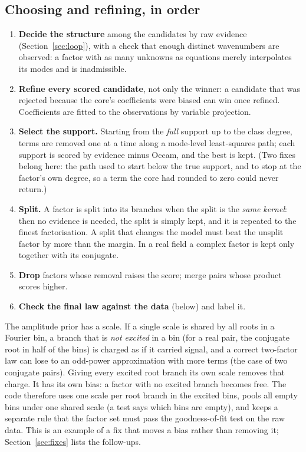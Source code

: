 \subsection{Choosing and refining, in order}
\begin{enumerate}[nosep]
\item \textbf{Decide the structure} among the candidates by raw evidence (Section~\ref{sec:loop}), with a check that enough distinct wavenumbers are observed: a factor with as many unknowns as equations merely interpolates its modes and is inadmissible.
\item \textbf{Refine every scored candidate}, not only the winner: a candidate that was rejected because the core's coefficients were biased can win once refined. Coefficients are fitted to the observations by variable projection.
\item \textbf{Select the support.} Starting from the \emph{full} support up to the class degree, terms are removed one at a time along a mode-level least-squares path; each support is scored by evidence minus Occam, and the best is kept. (Two fixes belong here: the path used to start below the true support, and to stop at the factor's own degree, so a term the core had rounded to zero could never return.)
\item \textbf{Split.} A factor is split into its branches when the split is the \emph{same kernel}: then no evidence is needed, the split is simply kept, and it is repeated to the finest factorisation. A split that changes the model must beat the unsplit factor by more than the margin. In a real field a complex factor is kept only together with its conjugate.
\item \textbf{Drop} factors whose removal raises the score; merge pairs whose product scores higher.
\item \textbf{Check the final law against the data} (below) and label it.
\end{enumerate}

\begin{caution}[title=Why a model comparison needs one scale per \emph{branch}]
The amplitude prior has a scale. If a single scale is shared by all roots in a Fourier bin, a branch that is \emph{not excited} in a bin (for a real pair, the conjugate root in half of the bins) is charged as if it carried signal, and a correct two-factor law can lose to an odd-power approximation with more terms (the case of two conjugate pairs). Giving every excited root branch its own scale removes that charge. It has its own bias: a factor with no excited branch becomes free. The code therefore uses one scale per root branch in the excited bins, pools all empty bins under one shared scale (a test says which bins are empty), and keeps a separate rule that the factor set must pass the goodness-of-fit test on the raw data. This is an example of a fix that moves a bias rather than removing it; Section~\ref{sec:fixes} lists the follow-ups.
\end{caution}

